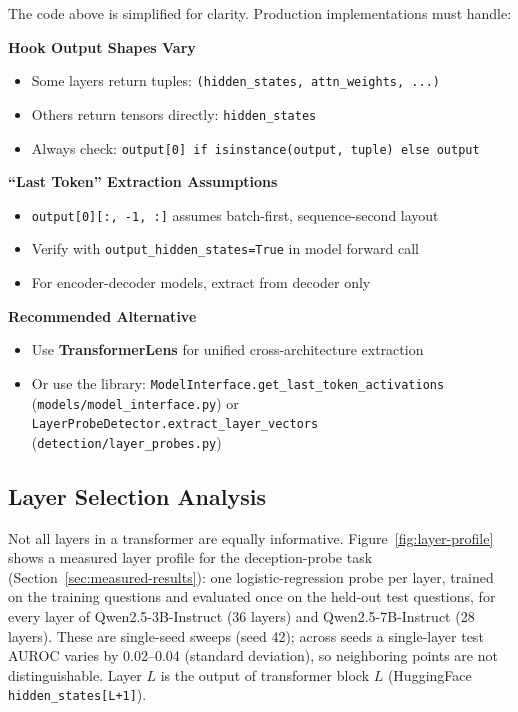 \documentclass[11pt,letterpaper]{article}
\let\origsubsection\subsection
\renewcommand{\subsection}{\needspace{8\baselineskip}\origsubsection}}
\begin{document}
\begin{warningbox}
The code above is simplified for clarity. Production implementations must handle:

\textbf{Hook Output Shapes Vary}
\begin{itemize}[nosep]
  \item Some layers return tuples: \texttt{(hidden\_states, attn\_weights, ...)}
  \item Others return tensors directly: \texttt{hidden\_states}
  \item Always check: \texttt{output[0] if isinstance(output, tuple) else output}
\end{itemize}

\textbf{``Last Token'' Extraction Assumptions}
\begin{itemize}[nosep]
  \item \texttt{output[0][:, -1, :]} assumes batch-first, sequence-second layout
  \item Verify with \texttt{output\_hidden\_states=True} in model forward call
  \item For encoder-decoder models, extract from decoder only
\end{itemize}

\textbf{Recommended Alternative}
\begin{itemize}[nosep]
  \item Use \textbf{TransformerLens} for unified cross-architecture extraction
  \item Or use the library: \texttt{ModelInterface.get\_last\_token\_activations} (\texttt{models/model\_interface.py}) or \texttt{LayerProbeDetector.extract\_layer\_vectors} (\texttt{detection/layer\_probes.py})
\end{itemize}
\end{warningbox}

\subsection{Layer Selection Analysis}
\label{sec:layer-selection}

Not all layers in a transformer are equally informative. Figure~\ref{fig:layer-profile} shows a measured layer profile for the deception-probe task (Section~\ref{sec:measured-results}): one logistic-regression probe per layer, trained on the training questions and evaluated once on the held-out test questions, for every layer of Qwen2.5-3B-Instruct (36 layers) and Qwen2.5-7B-Instruct (28 layers). These are single-seed sweeps (seed 42); across seeds a single-layer test AUROC varies by 0.02--0.04 (standard deviation), so neighboring points are not distinguishable. Layer $L$ is the output of transformer block $L$ (HuggingFace \texttt{hidden\_states[L+1]}).
\end{document}
